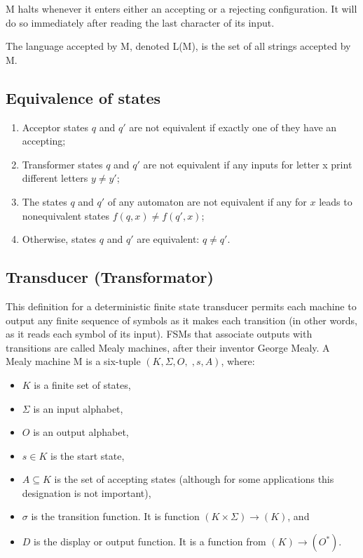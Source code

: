 \documentclass{article}
\begin{document}
M halts whenever it enters either an accepting or a rejecting configuration. It
will do so immediately after reading the last character of its input.

The language accepted by M, denoted L(M), is the set of all strings accepted by
M.

\subsection{Equivalence of states}

\begin{enumerate}
		\item Acceptor states $q$ and $q'$ are not equivalent if exactly one of
		they have an accepting;

		\item Transformer states $q$ and $q'$ are not equivalent if any inputs
		for letter x print different letters $y \ne y'$;

		\item The states $q$ and $q'$ of any automaton are not equivalent if any
		for $x$ leads to nonequivalent states $f(q,x) \ne f(q',x)$;

		\item Otherwise, states $q$ and $q'$ are equivalent: $q \ne q'$.
\end{enumerate}

\subsection{Transducer (Transformator)}

This definition for a deterministic finite state transducer permits each
machine to output any finite sequence of symbols as it makes each transition
(in other words, as it reads each symbol of its input).  FSMs that associate
outputs with transitions are called Mealy machines, after their inventor George
Mealy.  A Mealy machine M is a six-tuple $(K, \Sigma, O, , s, A)$, where: 

\begin{itemize}
	\item $K$ is a finite set of states,
	\item $\Sigma$ is an input alphabet,
	\item $O$ is an output alphabet,
	\item $s \in K$ is the start state,
	\item $A \subseteq K $ is the set of accepting states (although for some applications this designation is not important),
	\item $\sigma$ is the transition function. It is function $(K \times \Sigma) \to (K)$, and
	\item $D$ is the display or output function. It is a function from $(K) \to (O^*)$.
\end{itemize}
\end{document}
